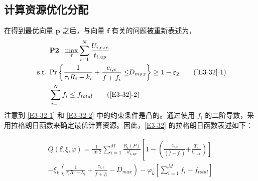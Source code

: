 \subsection{计算资源优化分配}\label{section3-3-4}
在得到最优向量 $\mathbf{p}$ 之后，与向量 $\mathbf{f}$ 有关的问题被重新表述为，
\begin{align}
& \textbf{P2}:\max\limits_{\mathbf{f}}\sum_{i=1}^{N}\frac{U_{i,exe}}{t_{i,up}}                                      \label{E3-32}\\
\text { s.t. }
& \textrm{Pr}\left\{\frac{1}{\tau_iR_i-k_i}+\frac{c_{i,e}}{\bar{f}+f_i}\le \!\!D_{max}\right\}\geq1-\varepsilon_2  \tag{\ref{E3-32}{-1}}      \label{E3-32-1}\\  %
& \sum_{i=1}^{N}f_i\le f_{total}                                                                                   \tag{\ref{E3-32}{-2}}      \label{E3-32-2}  %
\end{align}
注意到 \eqref{E3-32-1} 和 \eqref{E3-32-2} 中的约束条件是凸的。通过使用 $f_i$ 的二阶导数，采用拉格朗日函数来确定最优计算资源。因此，\eqref{E3-32} 的拉格朗日函数表述如下：

\begin{equation}\label{E33}
\begin{aligned}
Q\left(\mathbf{f},\xi,\varphi\right)=\frac{1}{\ln{2}}\sum_{i=1}^{M}\frac{R_i\left(P\right)}{ d_{i,up}}
\left[1-
\left(\frac{c_{i,e}}{\phantom{}\left(\bar{f}+f_i\right)}
\right.\right.
\left.\left.
+\frac{T_c}{t_{max}}
\right)
\right]\\
-\xi_k\left(\frac{1}{\tau_iR_i-\lambda_i}+\frac{c_{i,e}}{\bar{f}+f_i}-D_{max}\right)
-\varphi_k\left[\sum_{i=1}^{M}f_i-f_{total}\right]
\end{aligned}
\end{equation}
